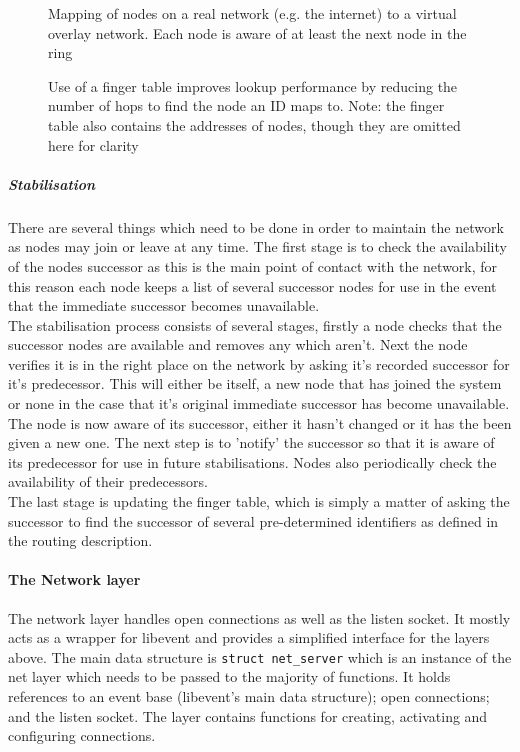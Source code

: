 \documentclass{article}
\begin{document}
\begin{figure}
\centering
\def\svgwidth{\columnwidth}

\caption{Mapping of nodes on a real network (e.g. the internet) to a virtual overlay network. Each node is aware of at least the next node in the ring}
\label{fig:rtovmap}
\end{figure}


\begin{figure}
\centering
\def\svgwidth{0.95\columnwidth}

\caption[caption]{Use of a finger table improves lookup performance by reducing the number of hops to find the node an ID maps to.
Note: the finger table also contains the addresses of nodes, though they are omitted here for clarity}
\label{fig:fingersRbttr}
\end{figure}


\subparagraph{Stabilisation} There are several things which need to be done in order to maintain the network as nodes may join or leave at any time. The first stage is to check the availability of the nodes successor as this is the main point of contact with the network, for this reason each node keeps a list of several successor nodes for use in the event that the immediate successor becomes unavailable.
\\
The stabilisation process consists of several stages, firstly a node checks that the successor nodes are available and removes any which aren't.
Next the node verifies it is in the right place on the network by asking it's recorded successor for it's predecessor. This will either be itself, a new node that has joined the system or none in the case that it's original immediate successor has become unavailable. The node is now aware of its successor, either it hasn't changed or it has the been given a new one. The next step is to 'notify' the successor so that it is aware of its predecessor for use in future stabilisations.
Nodes also periodically check the availability of their predecessors.
\\
The last stage is updating the finger table, which is simply a matter of asking the successor to find the successor of several pre-determined identifiers as defined in the routing description.



\paragraph{The Network layer}
The network layer handles open connections as well as the listen socket. It mostly acts as a wrapper for libevent and provides a simplified interface for the layers above. The main data structure is \texttt{struct net\_server} which is an instance of the net layer which needs to be passed to the majority of functions. It holds references to an event base (libevent's main data structure); open connections; and the listen socket. The layer contains functions for creating, activating and configuring connections.
\end{document}

